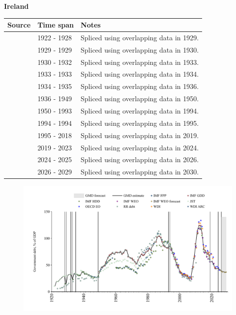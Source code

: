 \documentclass[12pt,a4paper,landscape]{article}
\begin{document}
\begin{adjustbox}{max totalsize={\paperwidth}{\paperheight},center}
\begin{minipage}[t][\textheight][t]{\textwidth}
\vspace*{0.5cm}
{}
\begin{center}
{\Large\bfseries Ireland}
\end{center}
\vspace{0.5cm}
\begin{table}[H]
\centering
\small
\begin{tabular}{|l|l|l|}
\hline
\textbf{Source} & \textbf{Time span} & \textbf{Notes} \\
\hline
\rowcolor{white}\cite{JST}& 1922 - 1928 &Spliced using overlapping data in 1929.\\
\rowcolor{lightgray}\cite{IMF_FPP}& 1929 - 1929 &Spliced using overlapping data in 1930.\\
\rowcolor{white}\cite{JST}& 1930 - 1932 &Spliced using overlapping data in 1933.\\
\rowcolor{lightgray}\cite{IMF_FPP}& 1933 - 1933 &Spliced using overlapping data in 1934.\\
\rowcolor{white}\cite{JST}& 1934 - 1935 &Spliced using overlapping data in 1936.\\
\rowcolor{lightgray}\cite{IMF_FPP}& 1936 - 1949 &Spliced using overlapping data in 1950.\\
\rowcolor{white}\cite{IMF_GDD}& 1950 - 1993 &Spliced using overlapping data in 1994.\\
\rowcolor{lightgray}\cite{IMF_FPP}& 1994 - 1994 &Spliced using overlapping data in 1995.\\
\rowcolor{white}\cite{IMF_GDD}& 1995 - 2018 &Spliced using overlapping data in 2019.\\
\rowcolor{lightgray}\cite{IMF_FPP}& 2019 - 2023 &Spliced using overlapping data in 2024.\\
\rowcolor{white}\cite{OECD_EO}& 2024 - 2025 &Spliced using overlapping data in 2026.\\
\rowcolor{lightgray}\cite{IMF_WEO_forecast}& 2026 - 2029 &Spliced using overlapping data in 2030.\\
\hline
\end{tabular}
\end{table}
\begin{figure}[H]
\centering
\includegraphics[width=\textwidth,height=0.6\textheight,keepaspectratio]{graphs/IRL_govdebt_GDP.pdf}

\end{figure}
\end{minipage}
\end{adjustbox}
\end{document}
